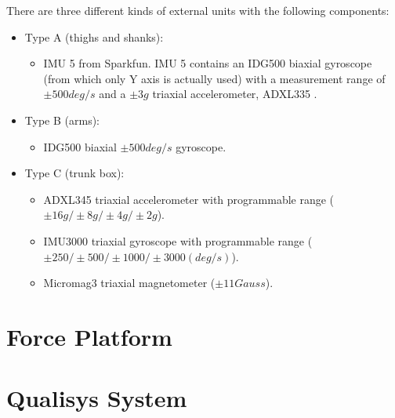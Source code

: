 There are three different kinds of external units with the following components:
\begin{itemize}
	\item Type A (thighs and shanks): 
	\begin{itemize}
		\item IMU 5 from Sparkfun. IMU 5 contains an IDG500  biaxial gyroscope (from which only Y axis is actually used) with a measurement range of $\pm500deg/s$ and a $\pm3g$ triaxial accelerometer, ADXL335 .
	\end{itemize}
	\item Type B (arms):
	\begin{itemize}
		\item IDG500  biaxial $\pm500deg/s$ gyroscope.
	\end{itemize}
	\item Type C (trunk box):
	\begin{itemize}
		\item ADXL345  triaxial accelerometer with programmable range ($\pm16g/\pm8g/\pm4g/\pm2g$).
		\item IMU3000 triaxial gyroscope with programmable range ($\pm250/\pm500/\pm1000/\pm3000 (deg/s)$).
		\item Micromag3  triaxial magnetometer ($\pm11Gauss$).
	\end{itemize}
\end{itemize}


\section{Force Platform}

\section{Qualisys System}